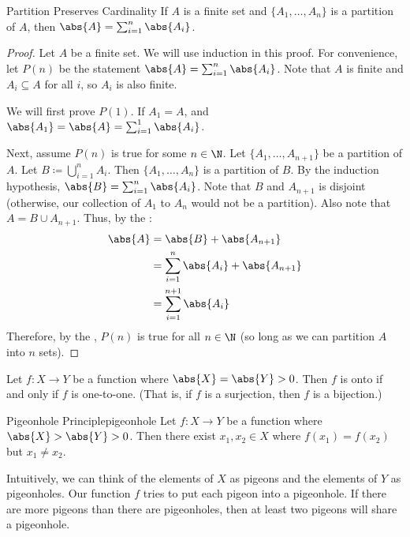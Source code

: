 \documentclass[letterpaper,12pt]{report}
\begin{document}
\begin{exbox}{Partition Preserves Cardinality}{}
    If $A$ is a finite set and $\{A_1, \ldots, A_n\}$ is a partition of $A$, then $\abs{A} = \sum_{i=1}^{n} \abs{A_i}$.
    \tcblower
    \begin{proof}
        Let $A$ be a finite set. We will use induction in this proof. For convenience, let $P(n)$ be the statement $\abs{A} = \sum_{i=1}^{n} \abs{A_i}$. Note that $A$ is finite and $A_i \subseteq A$ for all $i$, so $A_i$ is also finite.

        We will first prove $P(1)$. If $A_1 = A$, and $\abs{A_1} = \abs{A} = \sum_{i=1}^{1} \abs{A_i}$.

        Next, assume $P(n)$ is true for some $n \in \N$. Let $\{ A_1, \ldots, A_{n+1} \}$ be a partition of $A$. Let $B \coloneq \bigcup_{i=1}^{n}A_i$. Then $\{A_1, \ldots, A_n\}$ is a partition of $B$. By the induction hypothesis, $\abs{B} = \sum_{i=1}^{n} \abs{A_i}$. Note that $B$ and $A_{n+1}$ is disjoint (otherwise, our collection of $A_1$ to $A_n$ would not be a partition). Also note that $A = B \cup A_{n+1}$. Thus, by the :
        \begin{align*}
            \abs{A} &= \abs{B} + \abs{A_{n+1}} \\
            &= \sum_{i=1}^{n} \abs{A_i} + \abs{A_{n+1}} \\
            &= \sum_{i=1}^{n+1} \abs{A_i}
        \end{align*}
        Therefore, by the , $P(n)$ is true for all $n \in \N$ (so long as we can partition $A$ into $n$ sets).
    \end{proof}
\end{exbox}

\begin{exbox}{}{}
    Let $f : X \to Y$ be a function where $\abs{X} = \abs{Y} > 0$. Then $f$ is onto if and only if $f$ is one-to-one. (That is, if $f$ is a surjection, then $f$ is a bijection.)
\end{exbox}

\begin{thmbox}{Pigeonhole Principle}{pigeonhole}
    Let $f : X \to Y$ be a function where $\abs{X} > \abs{Y} > 0$. Then there exist $x_1, x_2 \in X$ where $f(x_1) = f(x_2)$ but $x_1 \neq x_2$.
\end{thmbox}

Intuitively, we can think of the elements of $X$ as pigeons and the elements of $Y$ as pigeonholes. Our function $f$ tries to put each pigeon into a pigeonhole. If there are more pigeons than there are pigeonholes, then at least two pigeons will share a pigeonhole.
\end{document}

